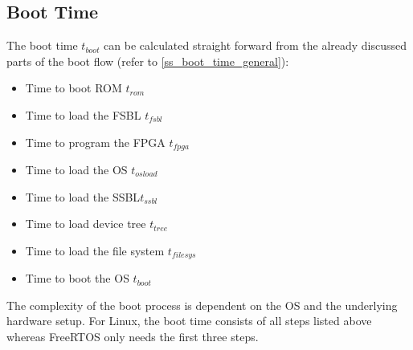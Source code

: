 \subsection{Boot Time}\label{ss_boot_time_math}
The boot time $ t_{boot} $ can be calculated straight forward from the already discussed parts of the boot flow (refer to \ref{ss_boot_time_general}):
\begin{itemize}
	\item Time to boot \ac{ROM} $ t_{rom} $
	\item Time to load the \ac{FSBL} $ t_{fsbl} $
	\item Time to program the \ac{FPGA} $ t_{fpga} $
	\item Time to load the \ac{OS} $ t_{osload} $
	\item Time to load the \ac{SSBL}$ t_{ssbl} $ 
	\item Time to load device tree $t_{tree} $
	\item Time to load the file system $ t_{filesys}$
	\item Time to boot the \ac{OS} $ t_{boot} $
\end{itemize} 
The complexity of the boot process is dependent on the \ac{OS} and the underlying hardware setup.
For Linux, the boot time consists of all steps listed above whereas FreeRTOS only needs the first three steps. 
  
